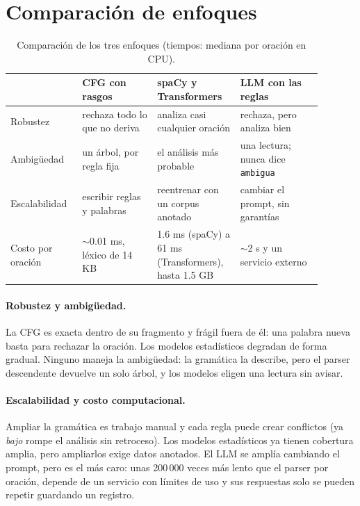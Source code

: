 \section{Comparación de enfoques}
\label{sec:comparacion_enfoques}

\begin{table}[h]
  \centering
  \small
  \begin{tabular}{p{0.19\linewidth}p{0.22\linewidth}p{0.24\linewidth}p{0.24\linewidth}}
    \toprule
    & CFG con rasgos & spaCy y Transformers & LLM con las reglas \\
    \midrule
    Robustez & rechaza todo lo que no deriva & analiza casi cualquier oración & rechaza, pero analiza bien \\
    Ambigüedad & un árbol, por regla fija & el análisis más probable & una lectura; nunca dice \texttt{ambigua} \\
    Escalabilidad & escribir reglas y palabras & reentrenar con un corpus anotado & cambiar el prompt, sin garantías \\
    Costo por oración & $\sim$0.01 ms, léxico de 14 KB & 1.6 ms (spaCy) a 61 ms (Transformers), hasta 1.5 GB & $\sim$2 s y un servicio externo \\
    \bottomrule
  \end{tabular}
  \caption{Comparación de los tres enfoques (tiempos: mediana por oración en CPU).}
  \label{tab:enfoques}
\end{table}

\paragraph{Robustez y ambigüedad.} La CFG es exacta dentro de su fragmento y frágil fuera de él:
una palabra nueva basta para rechazar la oración. Los modelos estadísticos degradan de forma
gradual. Ninguno maneja la ambigüedad: la gramática la describe, pero el parser descendente
devuelve un solo árbol, y los modelos eligen una lectura sin avisar.

\paragraph{Escalabilidad y costo computacional.} Ampliar la gramática es trabajo manual y cada
regla puede crear conflictos (ya \emph{bajo} rompe el análisis sin retroceso). Los modelos
estadísticos ya tienen cobertura amplia, pero ampliarlos exige datos anotados. El LLM se amplía
cambiando el prompt, pero es el más caro: unas 200\,000 veces más lento que el parser por
oración, depende de un servicio con límites de uso y sus respuestas solo se pueden repetir
guardando un registro.

